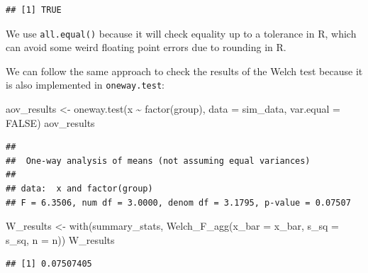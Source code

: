 \documentclass[
]{book}
\newenvironment{Shaded}{\begin{snugshade}}{\end{snugshade}}
\newcommand{\AttributeTok}[1]{\textcolor[rgb]{0.77,0.63,0.00}{#1}}
\newcommand{\ConstantTok}[1]{\textcolor[rgb]{0.00,0.00,0.00}{#1}}
\newcommand{\FunctionTok}[1]{\textcolor[rgb]{0.00,0.00,0.00}{#1}}
\newcommand{\NormalTok}[1]{#1}
\newcommand{\OtherTok}[1]{\textcolor[rgb]{0.56,0.35,0.01}{#1}}
\newcommand{\SpecialCharTok}[1]{\textcolor[rgb]{0.00,0.00,0.00}{#1}}
\begin{document}
\begin{Shaded}
\end{Shaded}

\begin{verbatim}
## [1] TRUE
\end{verbatim}

We use \texttt{all.equal()} because it will check equality up to a tolerance in R, which can avoid some weird floating point errors due to rounding in R.

We can follow the same approach to check the results of the Welch test because it is also implemented in \texttt{oneway.test}:

\begin{Shaded}
\begin{Highlighting}[]
\NormalTok{aov\_results }\OtherTok{\textless{}{-}} \FunctionTok{oneway.test}\NormalTok{(x }\SpecialCharTok{\textasciitilde{}} \FunctionTok{factor}\NormalTok{(group), }\AttributeTok{data =}\NormalTok{ sim\_data, }\AttributeTok{var.equal =} \ConstantTok{FALSE}\NormalTok{)}
\NormalTok{aov\_results}
\end{Highlighting}
\end{Shaded}

\begin{verbatim}
## 
##  One-way analysis of means (not assuming equal variances)
## 
## data:  x and factor(group)
## F = 6.3506, num df = 3.0000, denom df = 3.1795, p-value = 0.07507
\end{verbatim}

\begin{Shaded}
\begin{Highlighting}[]
\NormalTok{W\_results }\OtherTok{\textless{}{-}} \FunctionTok{with}\NormalTok{(summary\_stats, }\FunctionTok{Welch\_F\_agg}\NormalTok{(}\AttributeTok{x\_bar =}\NormalTok{ x\_bar, }\AttributeTok{s\_sq =}\NormalTok{ s\_sq, }\AttributeTok{n =}\NormalTok{ n))}
\NormalTok{W\_results}
\end{Highlighting}
\end{Shaded}

\begin{verbatim}
## [1] 0.07507405
\end{verbatim}

\begin{Shaded}
\end{Shaded}
\end{document}
